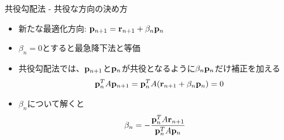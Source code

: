 \begin{frame}[t,fragile]{共役勾配法 - 共役な方向の決め方}
  \begin{itemize}
    \setlength{\itemsep}{1em}
  \item 新たな最適化方向: ${\bf p}_{n+1} = {\bf r}_{n+1} + \beta_n {\bf p}_n$
  \item $\beta_n=0$とすると最急降下法と等価
  \item 共役勾配法では、${\bf p}_{n+1}$と${\bf p}_{n}$が共役となるように$\beta_n {\bf p}_n$だけ補正を加える
    \begin{align*}
      {\bf p}_n^T A {\bf p}_{n+1} = {\bf p}_n^T A ({\bf r}_{n+1} + \beta_n {\bf p}_n) = 0
    \end{align*}
  \item $\beta_n$について解くと
    \begin{align*}
      \beta_n &= - \frac{{\bf p}_{n}^T A {\bf r}_{n+1}}{{\bf p}_n^T A {\bf p}_n}
    \end{align*}
  \end{itemize}
\end{frame}
